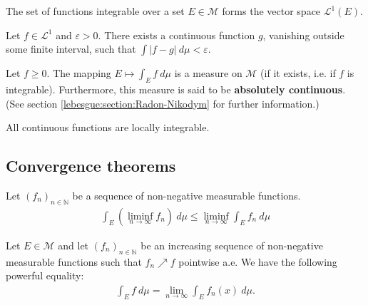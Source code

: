     \begin{definition}
        The set of functions integrable over a set $E\in\mathcal{M}$ forms the vector space $\mathcal{L}^1(E)$.
    \end{definition}

    \begin{property}
        Let $f\in\mathcal{L}^1$ and $\varepsilon>0$. There exists a continuous function $g$, vanishing outside some finite interval, such that $\int|f-g|\ d\mu<\varepsilon$.
    \end{property}

    \begin{property}\label{lebesgue:theorem:measure_by_integral}
        Let $f\geq0$. The mapping $E\mapsto\int_Ef\ d\mu$ is a measure on $\mathcal{M}$ (if it exists, i.e. if $f$ is integrable). Furthermore, this measure is said to be \textbf{absolutely continuous}. (See section \ref{lebesgue:section:Radon-Nikodym} for further information.)
    \end{property}

    \begin{example}
        All continuous functions are locally integrable.
    \end{example}

\subsection{Convergence theorems}

    \begin{theorem}\label{lebesgue:theorem:fatous_lemma}
        Let $(f_n)_{n\in\mathbb{N}}$ be a sequence of non-negative measurable functions.
        \begin{gather}
            \int_E\left(\liminf_{n\rightarrow\infty}f_n\right)\ d\mu \leq \liminf_{n\rightarrow\infty}\int_Ef_n\ d\mu
        \end{gather}
    \end{theorem}
    \begin{theorem}\label{lebesgue:theorem:monotone_convergence_theorem}
        Let $E\in\mathcal{M}$ and let $(f_n)_{n\in\mathbb{N}}$ be an increasing sequence of non-negative measurable functions such that $f_n\nearrow f$ pointwise a.e. We have the following powerful equality:
        \begin{gather}
            \int_E f\ d\mu = \lim_{n\rightarrow\infty}\int_E f_n(x)\ d\mu.
        \end{gather}
    \end{theorem}

